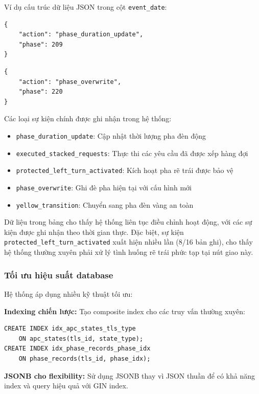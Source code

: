 Ví dụ cấu trúc dữ liệu JSON trong cột \texttt{event\_date}:

\begin{lstlisting}[style=json,caption={Cấu trúc JSON của sự kiện phase\_duration\_update}]
{
    "action": "phase_duration_update",
    "phase": 209
}
\end{lstlisting}

\begin{lstlisting}[style=json,caption={Cấu trúc JSON của sự kiện phase\_overwrite}]
{
    "action": "phase_overwrite", 
    "phase": 220
}
\end{lstlisting}

Các loại sự kiện chính được ghi nhận trong hệ thống:
\begin{itemize}
    \item \texttt{phase\_duration\_update}: Cập nhật thời lượng pha đèn động
    \item \texttt{executed\_stacked\_requests}: Thực thi các yêu cầu đã được xếp hàng đợi
    \item \texttt{protected\_left\_turn\_activated}: Kích hoạt pha rẽ trái được bảo vệ
    \item \texttt{phase\_overwrite}: Ghi đè pha hiện tại với cấu hình mới
    \item \texttt{yellow\_transition}: Chuyển sang pha đèn vàng an toàn
\end{itemize}

Dữ liệu trong bảng cho thấy hệ thống liên tục điều chỉnh hoạt động, với các sự kiện được ghi nhận theo thời gian thực. Đặc biệt, sự kiện \texttt{protected\_left\_turn\_activated} xuất hiện nhiều lần (8/16 bản ghi), cho thấy hệ thống thường xuyên phải xử lý tình huống rẽ trái phức tạp tại nút giao này.


\subsubsection{Tối ưu hiệu suất database}

Hệ thống áp dụng nhiều kỹ thuật tối ưu:

\textbf{Indexing chiến lược:} Tạo composite index cho các truy vấn thường xuyên:
\begin{lstlisting}[style=sql]
CREATE INDEX idx_apc_states_tls_type 
    ON apc_states(tls_id, state_type);
CREATE INDEX idx_phase_records_phase_idx 
    ON phase_records(tls_id, phase_idx);
\end{lstlisting}

\textbf{JSONB cho flexibility:} Sử dụng JSONB thay vì JSON thuần để có khả năng index và query hiệu quả với GIN index.

